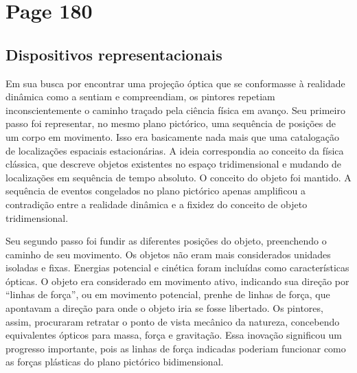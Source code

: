 \documentclass[a4paper]{article}
\begin{document}
\vspace*{\fill}

\newpage
\section*{Page 180}

\subsection*{Dispositivos representacionais}

Em sua busca por encontrar uma projeção óptica que se conformasse à realidade dinâmica como a sentiam e compreendiam, os pintores repetiam inconscientemente o caminho traçado pela ciência física em avanço. Seu primeiro passo foi representar, no mesmo plano pictórico, uma sequência de posições de um corpo em movimento. Isso era basicamente nada mais que uma catalogação de localizações espaciais estacionárias. A ideia correspondia ao conceito da física clássica, que descreve objetos existentes no espaço tridimensional e mudando de localizações em sequência de tempo absoluto. O conceito do objeto foi mantido. A sequência de eventos congelados no plano pictórico apenas amplificou a contradição entre a realidade dinâmica e a fixidez do conceito de objeto tridimensional.

Seu segundo passo foi fundir as diferentes posições do objeto, preenchendo o caminho de seu movimento. Os objetos não eram mais considerados unidades isoladas e fixas. Energias potencial e cinética foram incluídas como características ópticas. O objeto era considerado em movimento ativo, indicando sua direção por ``linhas de força'', ou em movimento potencial, prenhe de linhas de força, que apontavam a direção para onde o objeto iria se fosse libertado. Os pintores, assim, procuraram retratar o ponto de vista mecânico da natureza, concebendo equivalentes ópticos para massa, força e gravitação. Essa inovação significou um progresso importante, pois as linhas de força indicadas poderiam funcionar como as forças plásticas do plano pictórico bidimensional.
\end{document}
